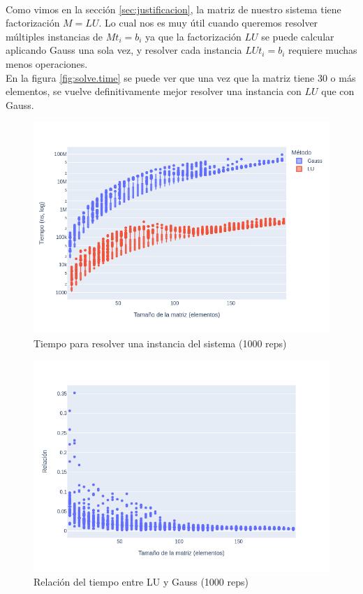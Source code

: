 \documentclass[12pt]{article}
\begin{document}
\paragraph{} Como vimos en la sección \ref{sec:justificacion}, la matriz de nuestro sistema tiene factorización \(M = LU\). Lo cual nos es muy útil cuando queremos resolver múltiples instancias de \(Mt_i = b_i\) ya que la factorización \(LU\) se puede calcular aplicando Gauss una sola vez, y resolver cada instancia \(LUt_i = b_i\) requiere muchas menos operaciones. \\
En la figura \ref{fig:solve.time} se puede ver que una vez que la matriz tiene 30 o más elementos, se vuelve definitivamente mejor resolver una instancia con \(LU\) que con Gauss. 

\begin{figure}[H]
\centering
\includegraphics[width=\textwidth]{times.solve.1000.1}
\caption{Tiempo para resolver una instancia del sistema (1000 reps)}
\label{fig:solve.time.1000.1}
\end{figure}

\begin{figure}[H]
\centering
\includegraphics[width=\textwidth]{times.ratio_lu_gauss.1000.1}
\caption{Relación del tiempo entre LU y Gauss (1000 reps)}
\label{fig:solve.time.ratio}
\end{figure}
\end{document}
